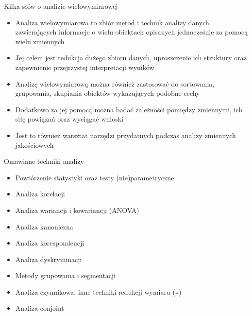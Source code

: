 \documentclass{beamer}
\begin{document}
\begin{frame}{Kilka słów o analizie wielowymiarowej}
  \begin{itemize}
  \item Analiza wielowymiarowa to zbiór metod i technik analizy danych zawierających informacje o wielu obiektach opisanych jednocześnie za pomocą wielu zmiennych
  \item Jej celem jest redukcja dużego zbioru danych, uproszczenie ich struktury oraz zapewnienie przejrzystej interpretacji wyników
  \item Analizę wielowymiarową można również zastosować do sortowania, grupowania, skupiania obiektów wykazujących podobne cechy
  \item Dodatkowo za jej pomocą można badać zależności pomiędzy zmiennymi, ich siłę powiązań oraz wyciągać wnioski
  \item Jest to również warsztat narzędzi przydatnych podczas analizy zmiennych jakościowych
  \end{itemize}
\end{frame}

\begin{frame}{Omawiane techniki analizy}
  \begin{itemize}
  \item Powtórzenie statystyki oraz testy (nie)parametryczne
  \item Analiza korelacji
  \item Analiza wariancji i kowariancji (ANOVA)
  \item Analiza kanoniczna
  \item Analiza korespondencji
  \item Analiza dyskryminacji
  \item Metody grupowania i segmentacji
  \item Analiza czynnikowa, inne techniki redukcji wymiaru ($\star$)
  \item Analiza conjoint
  \end{itemize}
\end{frame}
\end{document}
